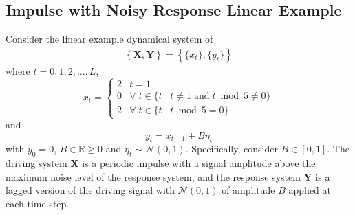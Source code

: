 \documentclass[twocolumn,aps,pre,groupedaddress]{revtex4-1}
\begin{document}
\subsection{Impulse with Noisy Response Linear Example}
\label{sec:IR}
Consider the linear example dynamical system of
\begin{eqnarray}
\label{eqn:IReqn}
\left\{\mathbf{X},\mathbf{Y}\right\} = \left\{\{x_t\},\{y_t\}\right\}
\end{eqnarray}
where $t=0,1,2,\ldots,L$,
\begin{equation*}
x_t = \left\{
  \begin{array}{lr}
    2 & t = 1\\
    0 & \forall\; t\in\{t\;|\;t\neq 1 \;\mathrm{and}\; t\bmod 5 \neq 0\}\\
    2 & \forall\; t\in\{t\;|\;t\bmod 5 = 0\}
  \end{array}
\right.
\end{equation*}
and
\begin{equation*}
y_t = x_{t-1} + B\eta_t
\end{equation*}
with $y_0 = 0$, $B\in\mathbb{R}\ge 0$ and $\eta_t\sim\mathcal{N}\left(0,1\right)$.  Specifically, consider $B\in[0,1]$.  The driving system $\mathbf{X}$ is a periodic impulse with a signal amplitude above the maximum noise level of the response system, and the response system $\mathbf{Y}$ is a lagged version of the driving signal with $\mathcal{N}\left(0,1\right)$ of amplitude $B$ applied at each time step.  
\end{document}
